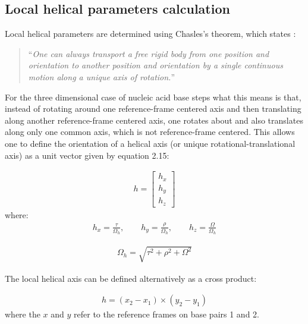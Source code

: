 \subsection{Local helical parameters calculation}

Local helical parameters are determined using Chasles's theorem, which
states \cite{babcock1994}:
\begin{quote}
``\textit{One can  always transport  a free rigid  body from one  position and
  orientation  to  another  position   and  orientation  by  a  single
  continuous motion along a unique axis of rotation.}''
\end{quote}

\noindent For the  three dimensional case of  nucleic acid base  steps what this
means is that, instead of rotating around one reference-frame centered
axis and then translating along another reference-frame centered axis,
one  rotates about  and also  translates along  only one  common axis,
which is not  reference-frame centered. This allows one  to define the
orientation  of  a helical  axis  (or unique  rotational-translational
axis) as a unit vector given by equation 2.15:

\begin{gather}
h=\left[ \begin{array}{c}
h_x\\
h_y\\
h_z
\end{array} \right]
\end{gather}
where:
\begin{gather}
h_x = \frac{\tau}{\Omega_h}, \qquad h_y = \frac{\rho}{\Omega_h},
\qquad h_z = \frac{\Omega}{\Omega_h}
\end{gather}

\begin{gather}
\Omega_h = \sqrt{\tau^2 + \rho^2 + \Omega^2}
\end{gather}

The local helical axis can be defined alternatively \cite{bansal1995}
as a cross product:

\begin{gather}
h = (x_2 - x_1) \times (y_2 - y_1)
\end{gather}
where the  $x$ and $y$ refer to  the reference frames on  base pairs 1
and 2.

